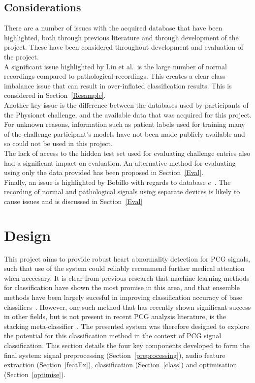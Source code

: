 \documentclass[titlepage, 12pt]{scrartcl} \usepackage{enumitem}
\begin{document}
\subsection{Considerations}\label{DBCons}
There are a number of issues with the acquired database that have been
highlighted, both through previous literature and through development of the
project. These have been considered throughout development and evaluation of
the project.\\
A significant issue highlighted by Liu et al.\ is the large number of normal
recordings compared to pathological recordings. This creates a clear class
imbalance issue that can result in over-inflated classification
results. This is considered in
Section~\ref{Resample}.\\
Another key issue is the difference between the databases used by participants of the
Physionet challenge, and the available data that was acquired for this project.
For unknown reasons, information such as patient labels used for training many
of the challenge participant's models have not been made publicly available and
so could not be used in this project.\\
The lack of access to the hidden test set used for evaluating challenge entries
also had a significant impact on evaluation. An alternative method for
evaluating using only the data provided has been proposed in
Section~\ref{Eval}.\\
Finally, an issue is highlighted by Bobillo with regards to database
$e$~\parencite{Bobillo2016}. The recording of normal and pathological signals using
separate devices is likely to cause issues and is discussed in
Section~\ref{Eval}


\section{Design}
This project aims to provide robust heart abnormality detection for PCG
signals, such that use of the system could reliably recommend further medical
attention when neccesary. It is clear from previous research that machine
learning methods for classification have shown the most promise in this area,
and that ensemble methods have been largely sucesful in improving
classification accuracy of base classifiers~\parencite{Homsi2017, Potes2016}.
However, one such method that has recently shown significant success in other
fields, but is not present in recent PCG analysis literature, is the stacking
meta-classifier~\parencite[p.498]{Tobergte2013a}. The presented system was
therefore designed to explore the potential for this classification method in
the context of PCG signal classification. This section details the four key
components developed to form the final system: signal preprocessing
(Section~\ref{preprocessing}), audio feature extraction (Section~\ref{featEx}),
classification (Section~\ref{class}) and optimisation (Section~\ref{optimise}).
\end{document}
